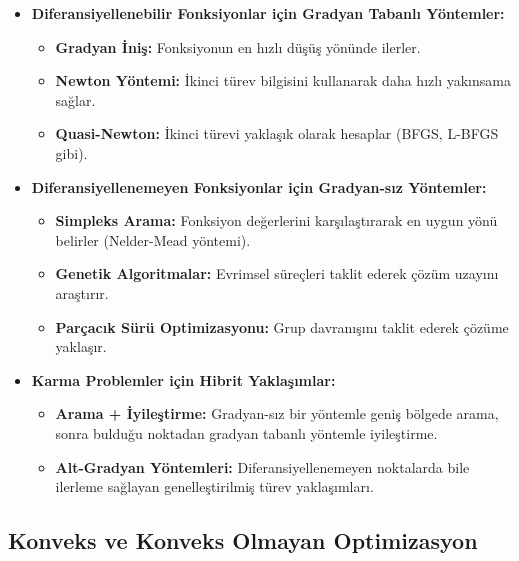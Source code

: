 \begin{tcolorbox}[title=Diferansiyellenebilirliğe Göre Optimizasyon Yöntemleri]
\begin{itemize}
    \item \textbf{Diferansiyellenebilir Fonksiyonlar için Gradyan Tabanlı Yöntemler:}
    \begin{itemize}
        \item \textbf{Gradyan İniş:} Fonksiyonun en hızlı düşüş yönünde ilerler.
        \item \textbf{Newton Yöntemi:} İkinci türev bilgisini kullanarak daha hızlı yakınsama sağlar.
        \item \textbf{Quasi-Newton:} İkinci türevi yaklaşık olarak hesaplar (BFGS, L-BFGS gibi).
    \end{itemize}
    
    \item \textbf{Diferansiyellenemeyen Fonksiyonlar için Gradyan-sız Yöntemler:}
    \begin{itemize}
        \item \textbf{Simpleks Arama:} Fonksiyon değerlerini karşılaştırarak en uygun yönü belirler (Nelder-Mead yöntemi).
        \item \textbf{Genetik Algoritmalar:} Evrimsel süreçleri taklit ederek çözüm uzayını araştırır.
        \item \textbf{Parçacık Sürü Optimizasyonu:} Grup davranışını taklit ederek çözüme yaklaşır.
    \end{itemize}
    
    \item \textbf{Karma Problemler için Hibrit Yaklaşımlar:}
    \begin{itemize}
        \item \textbf{Arama + İyileştirme:} Gradyan-sız bir yöntemle geniş bölgede arama, sonra bulduğu noktadan gradyan tabanlı yöntemle iyileştirme.
        \item \textbf{Alt-Gradyan Yöntemleri:} Diferansiyellenemeyen noktalarda bile ilerleme sağlayan genelleştirilmiş türev yaklaşımları.
    \end{itemize}
\end{itemize}
\end{tcolorbox}



\subsection{Konveks ve Konveks Olmayan Optimizasyon}

